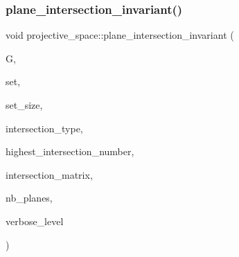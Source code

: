 \mbox{\label{classprojective__space_ae4ac1e0ff5c8c72ddb504b8931a43e79}} 
\subsubsection{\texorpdfstring{plane\+\_\+intersection\+\_\+invariant()}{plane\_intersection\_invariant()}}
{\footnotesize\ttfamily void projective\+\_\+space\+::plane\+\_\+intersection\+\_\+invariant (\begin{DoxyParamCaption}\item[{\mbox{\hyperlink{classgrassmann}{grassmann}} $\ast$}]{G,  }\item[{\mbox{\hyperlink{galois_8h_a09fddde158a3a20bd2dcadb609de11dc}{I\+NT}} $\ast$}]{set,  }\item[{\mbox{\hyperlink{galois_8h_a09fddde158a3a20bd2dcadb609de11dc}{I\+NT}}}]{set\+\_\+size,  }\item[{\mbox{\hyperlink{galois_8h_a09fddde158a3a20bd2dcadb609de11dc}{I\+NT}} $\ast$\&}]{intersection\+\_\+type,  }\item[{\mbox{\hyperlink{galois_8h_a09fddde158a3a20bd2dcadb609de11dc}{I\+NT}} \&}]{highest\+\_\+intersection\+\_\+number,  }\item[{\mbox{\hyperlink{galois_8h_a09fddde158a3a20bd2dcadb609de11dc}{I\+NT}} $\ast$\&}]{intersection\+\_\+matrix,  }\item[{\mbox{\hyperlink{galois_8h_a09fddde158a3a20bd2dcadb609de11dc}{I\+NT}} \&}]{nb\+\_\+planes,  }\item[{\mbox{\hyperlink{galois_8h_a09fddde158a3a20bd2dcadb609de11dc}{I\+NT}}}]{verbose\+\_\+level }\end{DoxyParamCaption})}

\mbox{\label{classprojective__space_aa4e6a1f8f4297e5b3098e548fd7e2696}} 
